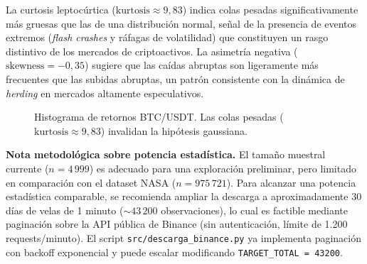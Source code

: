La curtosis leptocúrtica ($\text{kurtosis} \approx 9{,}83$) indica colas
pesadas significativamente más gruesas que las de una distribución normal,
señal de la presencia de eventos extremos (\textit{flash crashes} y ráfagas de
volatilidad) que constituyen un rasgo distintivo de los mercados de
criptoactivos. La asimetría negativa ($\text{skewness} = -0{,}35$) sugiere que
las caídas abruptas son ligeramente más frecuentes que las subidas abruptas,
un patrón consistente con la dinámica de \textit{herding} en mercados
altamente especulativos.

\begin{figure}[H]
    \centering
    \begin{minipage}[t]{0.48\textwidth}
        \centering
        \caption{Serie de retornos BTC/USDT. Se observan ráfagas de
                 volatilidad agrupada (efecto \textit{clustering}).}
        \label{fig:btc-serie}
    \end{minipage}
    \hfill
    \begin{minipage}[t]{0.48\textwidth}
        \centering
        \caption{Histograma de retornos BTC/USDT. Las colas pesadas
                 ($\text{kurtosis} \approx 9{,}83$) invalidan la hipótesis gaussiana.}
        \label{fig:btc-hist}
    \end{minipage}
\end{figure}

\textbf{Nota metodológica sobre potencia estadística.} El tamaño muestral
currente ($n = 4\,999$) es adecuado para una exploración preliminar, pero
limitado en comparación con el dataset NASA ($n = 975\,721$). Para alcanzar
una potencia estadística comparable, se recomienda ampliar la descarga a
aproximadamente 30 días de velas de 1 minuto ($\sim 43\,200$ observaciones),
lo cual es factible mediante paginación sobre la API pública de Binance
(sin autenticación, límite de 1.200 requests/minuto). El script
\texttt{src/descarga\_binance.py} ya implementa paginación con backoff
exponencial y puede escalar modificando \texttt{TARGET\_TOTAL = 43200}.

